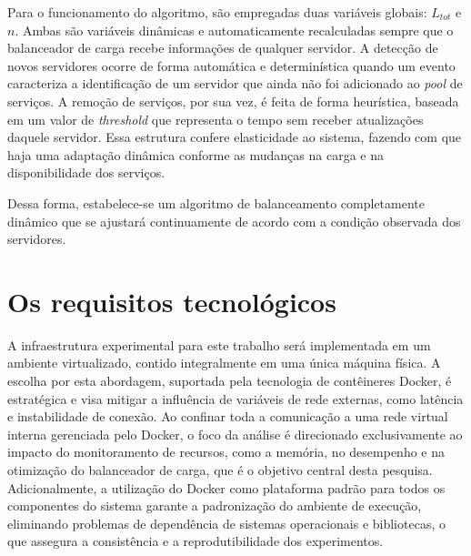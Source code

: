 Para o funcionamento do algoritmo, são empregadas duas variáveis globais: $L_{tot}$ e $n$. Ambas são variáveis dinâmicas e automaticamente recalculadas sempre que o balanceador de carga recebe informações de qualquer servidor. A detecção de novos servidores ocorre de forma automática e determinística quando um evento caracteriza a identificação de um servidor que ainda não foi adicionado ao \textit{pool} de serviços. A remoção de serviços, por sua vez, é feita de forma heurística, baseada em um valor de \textit{threshold} que representa o tempo sem receber atualizações daquele servidor. Essa estrutura confere elasticidade ao sistema, fazendo com que haja uma adaptação dinâmica conforme as mudanças na carga e na disponibilidade dos serviços.

Dessa forma, estabelece-se um algoritmo de balanceamento completamente dinâmico que se ajustará continuamente de acordo com a condição observada dos servidores.

\section{Os requisitos tecnológicos}

A infraestrutura experimental para este trabalho será implementada em um ambiente virtualizado, contido integralmente em uma única máquina física. A escolha por esta abordagem, suportada pela tecnologia de contêineres Docker, é estratégica e visa mitigar a influência de variáveis de rede externas, como latência e instabilidade de conexão. Ao confinar toda a comunicação a uma rede virtual interna gerenciada pelo Docker, o foco da análise é direcionado exclusivamente ao impacto do monitoramento de recursos, como a memória, no desempenho e na otimização do balanceador de carga, que é o objetivo central desta pesquisa. Adicionalmente, a utilização do Docker como plataforma padrão para todos os componentes do sistema garante a padronização do ambiente de execução, eliminando problemas de dependência de sistemas operacionais e bibliotecas, o que assegura a consistência e a reprodutibilidade dos experimentos.

